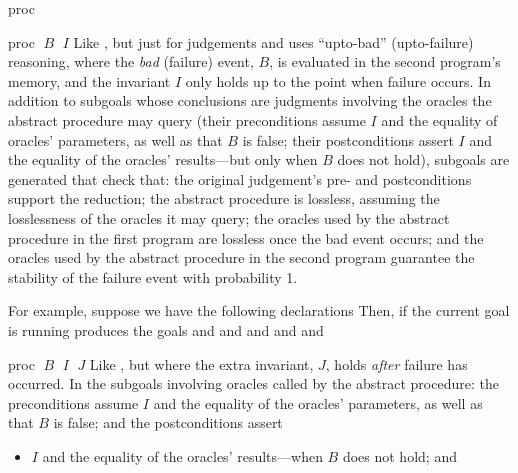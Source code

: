 \begin{tactic}{proc}
  \begin{tsyntax}{proc $\;B$ $\;I$}
    Like , but just for \prhl judgements and uses
    ``upto-bad'' (upto-failure) reasoning, where the \emph{bad}
    (failure) event, $B$, is evaluated in the second program's memory,
    and the invariant $I$ only holds up to the point when failure
    occurs.  In addition to subgoals whose conclusions are \prhl
    judgments involving the oracles the abstract procedure may query
    (their preconditions assume $I$ and the equality of oracles'
    parameters, as well as that $B$ is false; their
    postconditions assert $I$ and the equality of the oracles'
    results---but only when $B$ does not hold), subgoals are generated
    that check that: the original judgement's pre- and postconditions
    support the reduction; the abstract procedure is lossless,
    assuming the losslessness of the oracles it may query; the oracles
    used by the abstract procedure in the first program are lossless
    once the bad event occurs; and the oracles used by the abstract
    procedure in the second program guarantee the stability of the
    failure event with probability 1.

  \bigskip
  For example, suppose we have the following declarations
  Then, if the current goal is
  running 
  produces the goals
  and
  and
  and
  and
  and
  \end{tsyntax}

  \begin{tsyntax}{proc $\;B$ $\;I$ $\;J$}
    Like , but where the extra invariant, $J$,
    holds \emph{after} failure has occurred.  In the \prhl subgoals
    involving oracles called by the abstract procedure: the
    preconditions assume $I$ and the equality of the oracles'
    parameters, as well as that $B$ is
    false; and the postconditions assert
    \begin{itemize}
    \item $I$ and the equality of the oracles' results---when $B$ does
      not hold; and


\end{itemize}
\end{tsyntax}
\end{tactic}
